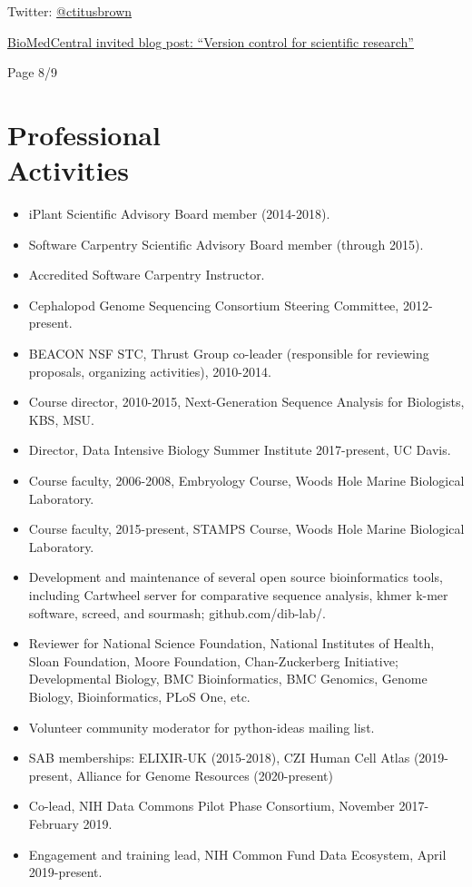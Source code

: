 \documentclass[margin,line]{resume}
\begin{document}
\begin{resume}
Twitter: \href{http://twitter.com/ctitusbrown}{@ctitusbrown}

\href{http://blogs.biomedcentral.com/bmcblog/2013/02/28/version-control-for-scientific-research/}{BioMedCentral invited blog post: ``Version control for scientific research''}

\vspace{2cm}
{\centerline {Page 8/9}}
\newpage

    \section{\mysidestyle Professional\\Activities}

\begin{itemize}
\item iPlant Scientific Advisory Board member (2014-2018).
\item Software Carpentry Scientific Advisory Board member (through 2015).
\item Accredited Software Carpentry Instructor.
\item Cephalopod Genome Sequencing Consortium Steering Committee, 2012-present.
\item BEACON NSF STC, Thrust Group co-leader (responsible for reviewing
proposals, organizing activities), 2010-2014.
\item Course director, 2010-2015, Next-Generation Sequence Analysis for Biologists, KBS, MSU.
\item Director, Data Intensive Biology Summer Institute 2017-present, UC Davis.
\item Course faculty, 2006-2008, Embryology Course, Woods Hole Marine Biological Laboratory.
\item Course faculty, 2015-present, STAMPS Course, Woods Hole Marine Biological Laboratory.
\item Development and maintenance of several open source bioinformatics tools, including
Cartwheel server for comparative sequence analysis, khmer k-mer software,
screed, and sourmash; github.com/dib-lab/.
\item Reviewer for National Science Foundation, National Institutes of Health, Sloan Foundation, Moore Foundation, Chan-Zuckerberg Initiative; Developmental Biology, BMC Bioinformatics, BMC Genomics, Genome Biology, Bioinformatics, PLoS One, etc.
\item Volunteer community moderator for python-ideas mailing list.
\item SAB memberships: ELIXIR-UK (2015-2018), CZI Human Cell Atlas (2019-present, Alliance for Genome Resources (2020-present)
\item Co-lead, NIH Data Commons Pilot Phase Consortium, November 2017-February 2019.
\item Engagement and training lead, NIH Common Fund Data Ecosystem, April 2019-present.
\end{itemize}


\end{resume}
\end{document}
